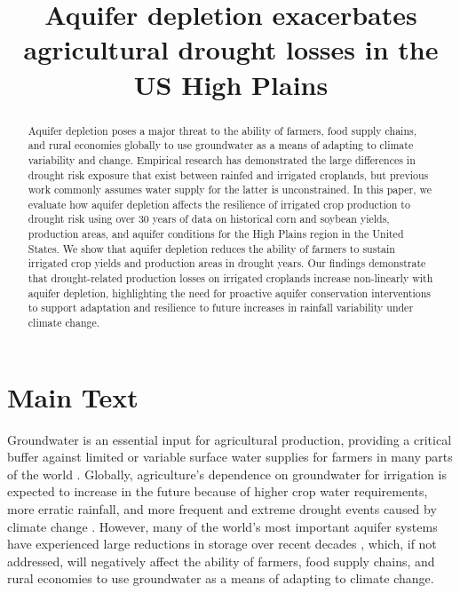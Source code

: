 \documentclass[
]{article}
\title{Aquifer depletion exacerbates agricultural drought losses in the US High Plains}
\date{}
\begin{document}
\maketitle



\begin{abstract}
Aquifer depletion poses a major threat to the ability of farmers, food supply chains, and rural economies globally to use groundwater as a means of adapting to climate variability and change. Empirical research has demonstrated the large differences in drought risk exposure that exist between rainfed and irrigated croplands, but previous work commonly assumes water supply for the latter is unconstrained. In this paper, we evaluate how aquifer depletion affects the resilience of irrigated crop production to drought risk using over 30 years of data on historical corn and soybean yields, production areas, and aquifer conditions for the High Plains region in the United States. We show that aquifer depletion reduces the ability of farmers to sustain irrigated crop yields and production areas in drought years. Our findings demonstrate that drought-related production losses on irrigated croplands increase non-linearly with aquifer depletion, highlighting the need for proactive aquifer conservation interventions to support adaptation and resilience to future increases in rainfall variability under climate change. 
\end{abstract}




\hypertarget{Main Text}{%
\section{Main Text}\label{Main Text}}

Groundwater is an essential input for agricultural production, providing a critical buffer against limited or variable surface water supplies for farmers in many parts of the world \citep{scanlon2023global}. Globally, agriculture’s dependence on groundwater for irrigation is expected to increase in the future because of higher crop water requirements, more erratic rainfall, and more frequent and extreme drought events caused by climate change \citep{zhou2010impact, wada2013multimodel, wada2014sustainability, kreins2015quantification, florke2018water}. However, many of the world’s most important aquifer systems have experienced large reductions in storage over recent decades \citep{wada2010global, famiglietti2011satellites, scanlon2012groundwater, konikow2015long, bierkens2019non}, which, if not addressed, will negatively affect the ability of farmers, food supply chains, and rural economies to use groundwater as a means of adapting to climate change. 
\end{document}

